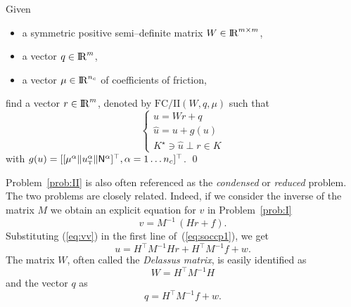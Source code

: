 \begin{problem}\label{prob:II}
  Given
  \begin{itemize}
    \item a symmetric positive semi--definite  matrix ${W} \in \mathrm{I\!R}^{m \times m}$,
    \item a vector $ {q} \in \mathrm{I\!R}^m$,
    \item a vector $\mu \in \mathrm{I\!R}^{n_c}$ of coefficients of friction, 
  \end{itemize}
find  a vector $r\in \mathrm{I\!R}^m$, denoted by $\mathrm{FC/II}(W,q,\mu)$  such that
\begin{equation}\label{eq:soccp2}
  \begin{cases}
    u =Wr +q \\[2mm]
    \hat u =u + g(u) \\[2mm]
    K^\star \ni {\hat u} \perp r \in K
  \end{cases}
\end{equation}
with $g(u) = [[\mu^\alpha  \|u^\alpha_{\hbox{\tiny{T}}}\| {\sf N}^\alpha]^\top, \alpha = 1\ldots n_c]^\top$.
\qed
\end{problem}





Problem~\ref{prob:II} is also often referenced as the \textit{condensed} or \textit{reduced} problem. The two problems are closely related. Indeed, if we consider the inverse of the matrix $M$ we obtain an explicit equation for $v$ in Problem~\ref{prob:I}
\begin{equation}
  \label{eq:vv}
  v = M^{-1}\,(Hr +f).
\end{equation}
Substituting (\ref{eq:vv}) in the first line of~(\ref{eq:soccp1}), we get
\begin{equation}
  \label{eq:vv-1}
  u = H^\top M^{-1} H r + H^\top M^{-1} f +w.
\end{equation}
The matrix $W$, often called the \textit{Delassus matrix}, is easily identified as
\begin{equation}
  \label{eq:Delassus}
  W = H^\top M^{-1} H 
\end{equation}
and the vector $q$ as
\begin{equation}
  \label{eq:qq}
  q = H^\top M^{-1} f + w.
\end{equation}

